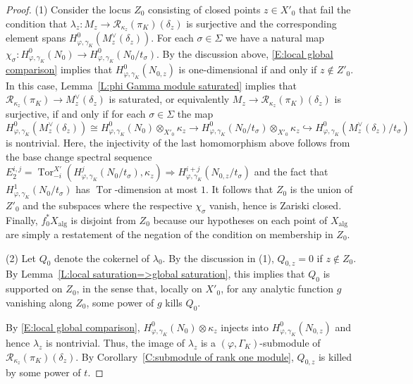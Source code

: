 \documentclass[12pt]{article}
\theoremstyle{definition}
\numberwithin{equation}{theorem}
\newcommand{\calR}{\mathcal{R}}
\newcommand{\alg}{\mathrm{alg}}
\DeclareMathOperator{\Tor}{Tor}
\begin{document}
\begin{proof}
(1) Consider the locus $Z_0$ consisting of closed points $z \in X'_0$
that fail the condition that $\lambda_z: M_z \to
\calR_{\kappa_z}(\pi_K)(\delta_z)$ is surjective and the corresponding
element spans $H_{\varphi,\gamma_K}^0(M_z^\vee(\delta_z))$.  For each
$\sigma \in \Sigma$ we have a natural map $\chi_\sigma: H^0_{\varphi,
  \gamma_K}(N_0) \to H^0_{\varphi, \gamma_K}(N_0/t_\sigma)$.  By the
discussion above, \eqref{E:local global comparison} implies that
$H^0_{\varphi, \gamma_K}(N_{0,z})$ is one-dimensional if and only if
$z \notin Z'_0$.  In this case, Lemma~\ref{L:phi Gamma module
  saturated} implies that $\calR_{\kappa_z}(\pi_K) \to
M^\vee_z(\delta_z)$ is saturated, or equivalently $M_z \to
\calR_{\kappa_z}(\pi_K)(\delta_z)$ is surjective, if and only if for
each $\sigma \in \Sigma$ the map
\[
H^0_{\varphi, \gamma_K}(M^\vee_z (\delta_z)) \cong H^0_{\varphi, \gamma_K}(N_0) \otimes_{X'_0} \kappa_z \to H^0_{\varphi, \gamma_K}(N_0/t_\sigma) \otimes_{X'_0} \kappa_z \hookrightarrow H^0_{\varphi, \gamma_K}(M^\vee_z (\delta_z) / t_\sigma)
\]
is nontrivial.  Here, the injectivity of the last homomorphism above
follows from the base change spectral sequence $E_2^{i,j} =
\Tor_{-i}^{X'}(H^j_{\varphi, \gamma_K}(N_0 / t_\sigma), \kappa_z)
\Rightarrow H^{i+j}_{\varphi, \gamma_K}(N_{0,z}/t_\sigma)$ and the
fact that $H^1_{\varphi,\gamma_K}(N_0/t_\sigma)$ has $\Tor$-dimension
at most $1$.  It follows that $Z_0$ is the union of $Z'_0$ and the
subspaces where the respective $\chi_\sigma$ vanish, hence is Zariski
closed.  Finally, $f_0^*X_\alg$ is disjoint from $Z_0$ because our
hypotheses on each point of $X_\alg$ are simply a restatement of the
negation of the condition on membership in $Z_0$.

(2) Let $Q_0$ denote the cokernel of $\lambda_0$.  By the discussion in (1), $Q_{0,z} = 0$ if $z \notin Z_0$. By Lemma~\ref{L:local saturation=>global saturation}, this implies that $Q_0$ is supported on $Z_0$, in the sense that, locally on $X'_0$, for any analytic function $g$ vanishing along $Z_0$, some power of $g$ kills $Q_0$.

By \eqref{E:local global comparison}, $H^0_{\varphi, \gamma_K}(N_0) \otimes \kappa_z$ injects into $H^0_{\varphi, \gamma_K}(N_{0,z})$ and hence $\lambda_z$ is nontrivial.
Thus, the image of $\lambda_z$ is a $(\varphi, \Gamma_K)$-submodule of $\calR_{\kappa_z}(\pi_K)(\delta_z)$.  By Corollary~\ref{C:submodule of rank one module}, $Q_{0,z}$ is killed by some power of $t$.


\end{proof}
\end{document}
